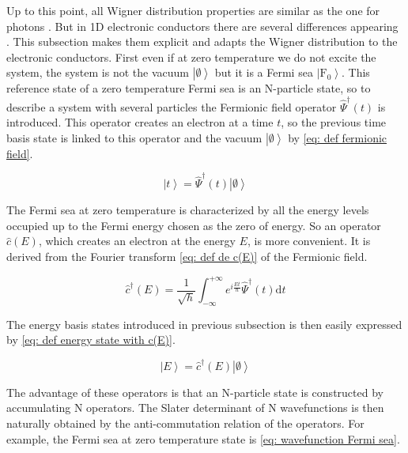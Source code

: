 Up to this point, all Wigner distribution properties are similar as the one for photons \cite{haroche2006exploring}.
But in 1D electronic conductors there are several differences appearing \cite{ferraro2013wigner}.
This subsection makes them explicit and adapts the Wigner distribution to the electronic conductors.
First even if at zero temperature we do not excite the system, the system is not the vacuum $\left|\emptyset\right>$ but it is a Fermi sea $\left|\mathrm{F}_{0}\right>$.
This reference state of a zero temperature Fermi sea is an N-particle state, so to describe a system with several particles the Fermionic field operator $\hat{\Psi}^{\dagger}\left(t\right)$ is introduced.
This operator creates an electron at a time $t$, so the previous time basis state is linked to this operator and the vacuum $\left|\emptyset\right>$ by \eqref{eq: def fermionic field}.

\begin{equation}
\left|t\right> = \hat{\Psi}^{\dagger}\left(t\right)\left|\emptyset\right> \label{eq: def fermionic field}
\end{equation}

The Fermi sea at zero temperature is characterized by all the energy levels occupied up to the Fermi energy chosen as the zero of energy.
So an operator $\hat{c}\left(E\right)$, which creates an electron at the energy $E$, is more convenient.
It is derived from the Fourier transform \eqref{eq: def de c(E)} of the Fermionic field.

\begin{equation}
\hat{c}^{\dagger}\left(E\right) = \frac{1}{\sqrt{h}}\int_{-\infty}^{+\infty}e^{i\frac{Et}{\hbar}}\hat{\Psi}^{\dagger}\left(t\right)\mathrm{d}t \label{eq: def de c(E)}
\end{equation}

The energy basis states introduced in previous subsection is then easily expressed by \eqref{eq: def energy state with c(E)}.

\begin{equation}
\left|E\right> = \hat{c}^{\dagger}\left(E\right)\left|\emptyset\right> \label{eq: def energy state with c(E)}
\end{equation}

The advantage of these operators is that an N-particle state is constructed by accumulating N operators.
The Slater determinant of N wavefunctions is then naturally obtained by the anti-commutation relation of the operators.
For example, the Fermi sea at zero temperature state is \eqref{eq: wavefunction Fermi sea}.

